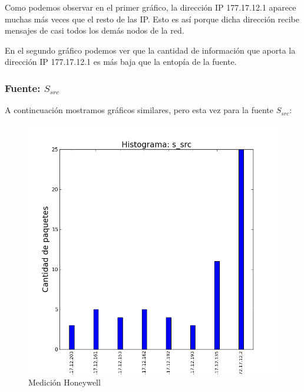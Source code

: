 Como podemos observar en el primer gráfico, la dirección IP 177.17.12.1 aparece muchas más veces que el resto de las IP. Esto es así porque dicha dirección recibe mensajes de casi todos los demás nodos de la red.

En el segundo gráfico podemos ver que la cantidad de información que aporta la dirección IP 177.17.12.1 es más baja que la entopía de la fuente.
 
 
\subsubsection{Fuente: $S_{src}$}

A contincuación mostramos gráficos similares, pero esta vez para la fuente $S_{src}$:

\begin{figure}[H]
   \begin{minipage}{0.5\linewidth}
     \includegraphics[width=\linewidth]{../imgs/snifAlto-ips_s_src_hist.png}
     \caption{Medición Honeywell}\label{fig:Alto-src-hist}
   \end{minipage}
  \hfill
   \begin{minipage}{0.5\linewidth}

\end{minipage}
\end{figure}
